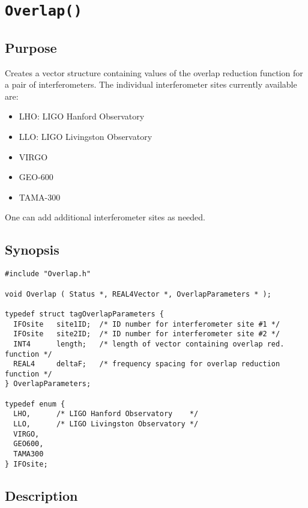 \documentclass{article}
\begin{document}
\section{{\tt Overlap()}}

\subsection{Purpose}

Creates a vector structure containing values of the overlap reduction 
function for a pair of interferometers.
The individual interferometer sites currently available are:
%
\begin{itemize}
\item LHO: LIGO Hanford Observatory
\item LLO: LIGO Livingston Observatory
\item VIRGO
\item GEO-600
\item TAMA-300
\end{itemize}
%
One can add additional interferometer sites as needed.

\subsection{Synopsis}

\begin{verbatim}
#include "Overlap.h"

void Overlap ( Status *, REAL4Vector *, OverlapParameters * );

typedef struct tagOverlapParameters {
  IFOsite   site1ID;  /* ID number for interferometer site #1 */
  IFOsite   site2ID;  /* ID number for interferometer site #2 */
  INT4      length;   /* length of vector containing overlap red. function */
  REAL4     deltaF;   /* frequency spacing for overlap reduction function */
} OverlapParameters;

typedef enum {
  LHO,      /* LIGO Hanford Observatory    */
  LLO,      /* LIGO Livingston Observatory */
  VIRGO,
  GEO600,
  TAMA300
} IFOsite;
\end{verbatim}

\subsection{Description}
\end{document}
